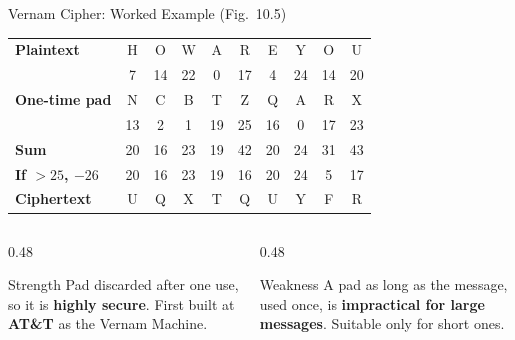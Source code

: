 \documentclass[aspectratio=169,11pt,xcolor={table}]{beamer}
\begin{document}
\begin{frame}{Vernam Cipher: Worked Example (Fig.\ 10.5)}
  \centering
  \renewcommand{\arraystretch}{1.25}
  \small
  \begin{tabular}{>{\bfseries}l *{9}{c}}
    \toprule
    \rowcolor{leaf!12} Plaintext & H & O & W & A & R & E & Y & O & U\\
    \rowcolor{leaf!12} & 7 & 14 & 22 & 0 & 17 & 4 & 24 & 14 & 20\\
    \rowcolor{amber!15} One-time pad & N & C & B & T & Z & Q & A & R & X\\
    \rowcolor{amber!15} & 13 & 2 & 1 & 19 & 25 & 16 & 0 & 17 & 23\\
    Sum & 20 & 16 & 23 & 19 & 42 & 20 & 24 & 31 & 43\\
    If $>25$, $-26$ & 20 & 16 & 23 & 19 & \textcolor{brick}{16} & 20 & 24 & \textcolor{brick}{5} & \textcolor{brick}{17}\\
    \rowcolor{brick!12} Ciphertext & U & Q & X & T & Q & U & Y & F & R\\
    \bottomrule
  \end{tabular}
  \vspace{3mm}
  \begin{columns}[T]
    \begin{column}{0.48\textwidth}
      \begin{exampleblock}{Strength}
        \small Pad discarded after one use, so it is \textbf{highly secure}. First built at \textbf{AT\&T} as the Vernam Machine.
      \end{exampleblock}
    \end{column}
    \begin{column}{0.48\textwidth}
      \begin{alertblock}{Weakness}
        \small A pad as long as the message, used once, is \textbf{impractical for large messages}. Suitable only for short ones.
      \end{alertblock}
    \end{column}
  \end{columns}
\end{frame}
\end{document}
